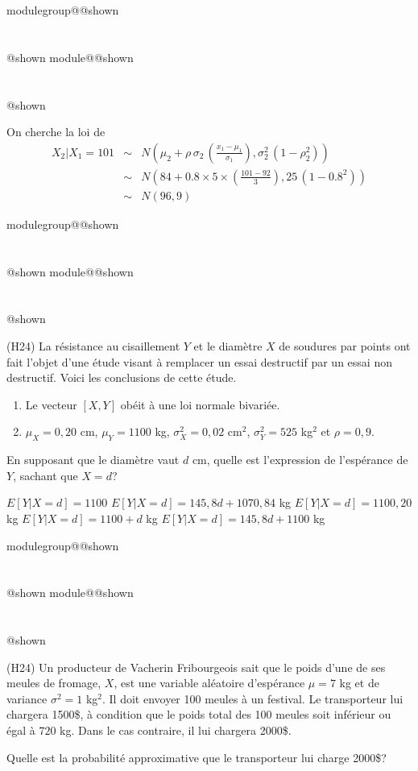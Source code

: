 \documentclass{Evaluation}
\makeatletter
\newcommand{\currentmodulekey}{}
\newcommand{\currentmoduletitle}{}
\newcommand{\currentgroupkey}{}
\newcommand{\currentgrouptitle}{}
\newcommand{\showmoduleifneeded}{%
  \ifx\currentgroupkey\empty\else
    \expandafter\ifx\csname modulegroup@\currentgroupkey @shown\endcsname\relax
      \section*{\currentgrouptitle}%
      \expandafter\gdef\csname modulegroup@\currentgroupkey @shown\endcsname{1}%
    \fi
  \fi
  \expandafter\ifx\csname module@\currentmodulekey @shown\endcsname\relax
    \section*{\currentmoduletitle}%
    \expandafter\gdef\csname module@\currentmodulekey @shown\endcsname{1}%
  \fi
}
\newenvironment{H23}{\showmoduleifneeded}{}
\newenvironment{H24}{\showmoduleifneeded}{}
\makeatother
\begin{document}
\begin{questions}
\begin{H23}
\begin{solution}
On cherche la loi de
		\begin{eqnarray*}
			{X}_2|{X}_1=101 &\sim& N\left(\mu_2 +\rho\, \sigma_2\, \left(\frac{x_1-\mu_1}{\sigma_1}\right),\sigma_2^2 \,\left(1-\rho_2^2\right)\right)\\
			&\sim& N\left(84 +0.8\times 5\times \left(\frac{101-92}{3}\right),25 \,\left(1-0.8^2\right)\right)\\
			&\sim& N\left(96, 9 \right)
	\end{eqnarray*}
\end{solution}
\end{H23}

\begin{H24}
\question
(H24)
La résistance au cisaillement $Y$ et le diamètre $X$ de soudures par points ont fait l'objet d'une étude visant à remplacer un essai destructif par un essai non destructif. Voici les conclusions de cette étude.
\begin{enumerate}
    \item Le vecteur $[X,Y]$ obéit à une loi normale bivariée.
    \item $\mu_X=0,20$ cm, $\mu_Y=1100$ kg, $\sigma^2_X=0,02$ cm$^2$, $\sigma^2_Y=525$ kg$^2$ et $\rho = 0,9$.
\end{enumerate}

En supposant que le diamètre vaut $d$ cm, quelle est l'expression de l'espérance de $Y$, sachant que $X=d$?

 \begin{checkboxes}
		\choice $E[Y|X=d]=1100$  %
		\correctchoice $E[Y|X=d]=145,8d + 1070,84$ kg %
		\choice $E[Y|X=d]=1100,20$ kg %
		\choice $E[Y|X=d]=1100+d$ kg%
		\choice $E[Y|X=d]=145,8d + 1100$ kg%
\end{checkboxes}

\vspace{0.5cm}
\end{H24}

\begin{H24}
\question
(H24)
Un producteur de Vacherin Fribourgeois sait que le poids d'une de ses meules de fromage, $X$, est une variable aléatoire d'espérance $\mu=7$ kg et de variance $\sigma^2 = 1$ kg$^2$. Il doit envoyer 100 meules à un festival. Le transporteur lui chargera 1500\$, à condition que le poids total des 100 meules soit inférieur ou égal à $720$ kg. Dans le cas contraire, il lui chargera 2000\$.

Quelle est la probabilité approximative que le transporteur lui charge 2000\$?
 

\end{H24}
\end{questions}
\end{document}
